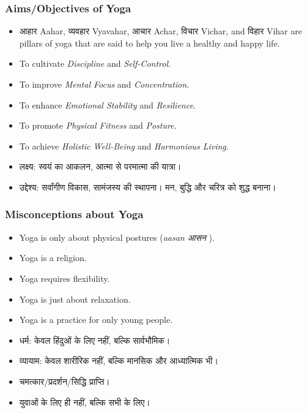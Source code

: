 \begin{frame}[fragile]\frametitle{Aims/Objectives of Yoga}

      \begin{itemize}
		\item आहार  Aahar, व्यवहार  Vyavahar, आचार  Achar, विचार  Vichar, and विहार  Vihar are pillars of yoga that are said to help you live a healthy and happy life.
		\item To cultivate \textit{Discipline} and \textit{Self-Control}.
		\item To improve \textit{Mental Focus} and \textit{Concentration}.
		\item To enhance \textit{Emotional Stability} and \textit{Resilience}.
		\item To promote \textit{Physical Fitness} and \textit{Posture}.
		\item To achieve \textit{Holistic Well-Being} and \textit{Harmonious Living}.
		\item लक्ष्य: स्वयं का आकलन, आत्मा से परमात्मा की यात्रा।
		\item उद्देश्य: सर्वांगीण विकास, सामंजस्य की स्थापना। मन, बुद्धि और चरित्र को शुद्ध बनाना।
	  \end{itemize}

\end{frame}

\begin{frame}[fragile]\frametitle{Misconceptions about Yoga}

      \begin{itemize}
		\item Yoga is only about physical postures (\textit{aasan आसन }).
		\item Yoga is a religion.
		\item Yoga requires flexibility.
		\item Yoga is just about relaxation.
		\item Yoga is a practice for only young people.
		\item  धर्म: केवल हिंदुओं के लिए नहीं, बल्कि सार्वभौमिक।
		\item  व्यायाम: केवल शारीरिक नहीं, बल्कि मानसिक और आध्यात्मिक भी।
		\item  चमत्कार/प्रदर्शन/सिद्धि प्राप्ति।
		\item  युवाओं के लिए ही नहीं, बल्कि सभी के लिए।		
	  \end{itemize}

\end{frame}


